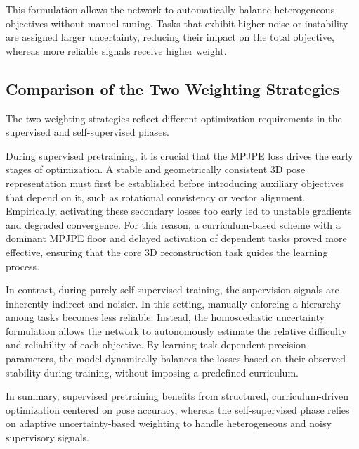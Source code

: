 This formulation allows the network to automatically balance heterogeneous objectives without manual tuning. Tasks that exhibit higher noise or instability are assigned larger uncertainty, reducing their 
impact on the total objective, whereas more reliable signals receive higher weight.

\subsection{Comparison of the Two Weighting Strategies}
The two weighting strategies reflect different optimization requirements in the supervised and self-supervised phases.

During supervised pretraining, it is crucial that the MPJPE loss drives the early stages of optimization. A stable and geometrically consistent 3D pose representation must first be established before 
introducing auxiliary objectives that depend on it, such as rotational consistency or vector alignment. Empirically, activating these secondary losses too early led to unstable gradients and degraded 
convergence. For this reason, a curriculum-based scheme with a dominant MPJPE floor and delayed activation of dependent tasks proved more effective, ensuring that the core 3D reconstruction task guides 
the learning process.

In contrast, during purely self-supervised training, the supervision signals are inherently indirect and noisier. In this setting, manually enforcing a hierarchy among tasks becomes less reliable. Instead, 
the homoscedastic uncertainty formulation allows the network to autonomously estimate the relative difficulty and reliability of each objective. By learning task-dependent precision parameters, the model 
dynamically balances the losses based on their observed stability during training, without imposing a predefined curriculum.

In summary, supervised pretraining benefits from structured, curriculum-driven optimization centered on pose accuracy, whereas the self-supervised phase relies on adaptive uncertainty-based weighting to 
handle heterogeneous and noisy supervisory signals.